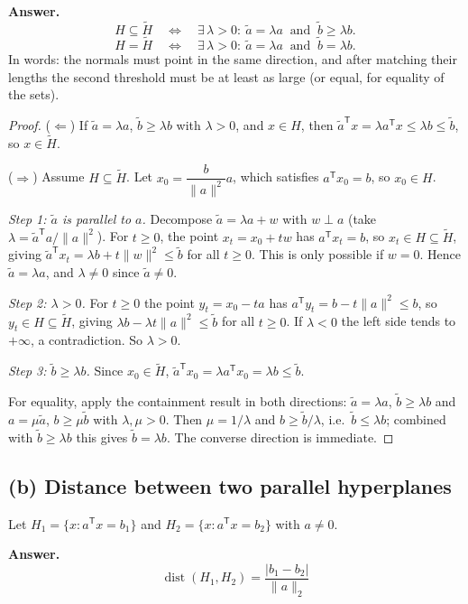 \documentclass[11pt]{article}
\newcommand{\T}{^{\mathsf T}}
\newcommand{\lam}{\lambda}
\newcommand{\answer}[1]{\begin{shaded}\noindent\textbf{Answer.} #1\end{shaded}}
\begin{document}
\answer{\[
H\subseteq\tilde H\quad\Longleftrightarrow\quad \exists\,\lam>0:\ \tilde a=\lam a\ \text{ and }\ \tilde b\ge\lam b .
\]
\[
H=\tilde H\quad\Longleftrightarrow\quad \exists\,\lam>0:\ \tilde a=\lam a\ \text{ and }\ \tilde b=\lam b .
\]
In words: the normals must point in the same direction, and after matching their lengths the second threshold must be at least as large (or equal, for equality of the sets).}

\begin{proof}
($\Leftarrow$) If $\tilde a=\lam a$, $\tilde b\ge\lam b$ with $\lam>0$, and $x\in H$, then $\tilde a\T x=\lam a\T x\le\lam b\le\tilde b$, so $x\in\tilde H$.

($\Rightarrow$) Assume $H\subseteq\tilde H$. Let $x_0=\dfrac{b}{\|a\|^2}a$, which satisfies $a\T x_0=b$, so $x_0\in H$.

\emph{Step 1: $\tilde a$ is parallel to $a$.} Decompose $\tilde a=\lam a+w$ with $w\perp a$ (take $\lam=\tilde a\T a/\|a\|^2$). For $t\ge0$, the point $x_t=x_0+tw$ has $a\T x_t=b$, so $x_t\in H\subseteq\tilde H$, giving $\tilde a\T x_t=\lam b+t\|w\|^2\le\tilde b$ for all $t\ge0$. This is only possible if $w=0$. Hence $\tilde a=\lam a$, and $\lam\ne0$ since $\tilde a\ne0$.

\emph{Step 2: $\lam>0$.} For $t\ge0$ the point $y_t=x_0-ta$ has $a\T y_t=b-t\|a\|^2\le b$, so $y_t\in H\subseteq\tilde H$, giving $\lam b-\lam t\|a\|^2\le\tilde b$ for all $t\ge0$. If $\lam<0$ the left side tends to $+\infty$, a contradiction. So $\lam>0$.

\emph{Step 3: $\tilde b\ge\lam b$.} Since $x_0\in\tilde H$, $\tilde a\T x_0=\lam a\T x_0=\lam b\le\tilde b$.

For equality, apply the containment result in both directions: $\tilde a=\lam a$, $\tilde b\ge\lam b$ and $a=\mu\tilde a$, $b\ge\mu\tilde b$ with $\lam,\mu>0$. Then $\mu=1/\lam$ and $b\ge\tilde b/\lam$, i.e.\ $\tilde b\le\lam b$; combined with $\tilde b\ge\lam b$ this gives $\tilde b=\lam b$. The converse direction is immediate.
\end{proof}

\begin{samepage}
\subsection*{(b) Distance between two parallel hyperplanes}
Let $H_1=\{x:a\T x=b_1\}$ and $H_2=\{x:a\T x=b_2\}$ with $a\ne0$.

\answer{\[
\boxed{\operatorname{dist}(H_1,H_2)=\frac{|b_1-b_2|}{\|a\|_2}}
\]}
\end{samepage}
\end{document}
